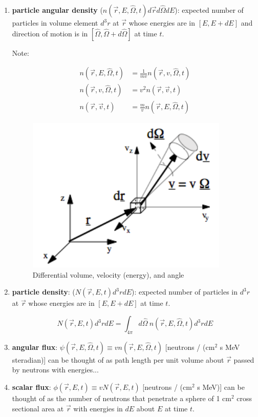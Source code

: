 \documentclass[12pt]{article}
\newcommand{\vOmega}{\ensuremath{\hat{\Omega}}}
\begin{document}
\begin{enumerate}
\item \textbf{particle angular density}
      ($n(\vec{r}, E, \vOmega, t)d\vec{r} d\vOmega dE$): expected number of 
      particles in volume element $d^3r$ at $\vec{r}$ whose energies are in
      $[E, E + dE]$ and direction of motion is in
      $[\vOmega, \vOmega + d\vOmega]$ at time $t$.

Note:

\begin{align*}
n(\vec{r}, E, \vOmega, t) &= \frac{1}{mv}n(\vec{r}, v, \vOmega, t) \\
n(\vec{r}, v, \vOmega, t) &= v^2 n(\vec{r}, \vec{v}, t) \\
n(\vec{r}, \vec{v}, t) &= \frac{m}{v}n(\vec{r}, E, \vOmega, t)
\end{align*}
\begin{figure}[h!]
    \begin{center}
    \includegraphics[keepaspectratio, width = 2.5 in]{differential-element}
    \end{center}
    \caption{Differential volume, velocity (energy), and angle}
    \label{fig:differential}
\end{figure}

\item \textbf{particle density}: ($N(\vec{r},E,t)d^3r dE$): expected number of 
      particles in $d^3r$ at $\vec{r}$ whose energies are in $[E, E + dE]$ at 
      time $t$.

\[N(\vec{r},E,t)d^3r dE =
\int_{4\pi} d\vOmega\: n(\vec{r}, E, \vOmega, t)d^3r dE \]

\item \textbf{angular flux}:
      $\psi(\vec{r}, E, \vOmega, t) \equiv v n(\vec{r}, E, \vOmega, t)$
      [neutrons / (cm$^2$ s MeV steradian)] can be thought of as path length 
      per unit volume about $\vec{r}$ passed by neutrons with energies...

\item \textbf{scalar flux}: $\phi(\vec{r},E,t) \equiv v N(\vec{r},E,t)$ 
      [neutrons / (cm$^2$ s MeV)] can be thought of as the number of neutrons 
      that penetrate a sphere of 1 cm$^2$ cross sectional area at $\vec{r}$ 
      with energies in $dE$ about $E$ at time $t$.


\end{enumerate}
\end{document}
